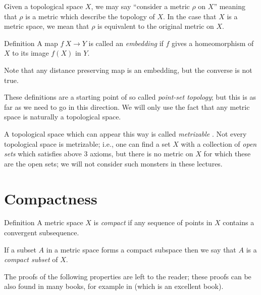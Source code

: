 Given a topological space $X$, 
we may say ``consider a metric $\rho$ on $X$'' 
meaning that $\rho$ is a metric which describe the topology of $X$.
In the case that $X$ is a metric space,
we mean that $\rho$ is equivalent to the original metric on $X$. 

\begin{thm}{Definition}
A map $f\:X\to Y$ is called an \emph{embedding}
if $f$ gives a homeomorphism of $X$ to its image $f(X)$ in $Y$.
\end{thm}

Note that any distance preserving map is an embedding,
but the converse is not true. 

These definitions are a starting point of so called \emph{point-set topology};
but this is as far as we need to go in this direction.
We will only use the fact that any metric space is naturally a topological space.

A topological space which can appear this way is called \emph{metrizable}%
.
Not every topological space is metrizable;
i.e., one can find a set $X$ with a collection of \textit{open sets}
which satisfies above 3 axioms, but there is no metric on $X$ for which these are the open sets; 
we will not consider such monsters in these lectures.



\section{Compactness}

\begin{thm}{Definition}
A metric space $X$ is \emph{compact} if any sequence of points in $X$ contains a convergent subsequence.

If a subset $A$ in a metric space forms a compact subspace then we say that $A$ is a \emph{compact subset} of $X$.
\end{thm}


The proofs of the following properties are left to the reader;
these proofs can be also found in many books,
for example in \cite{rudin}
(which is an excellent book).

